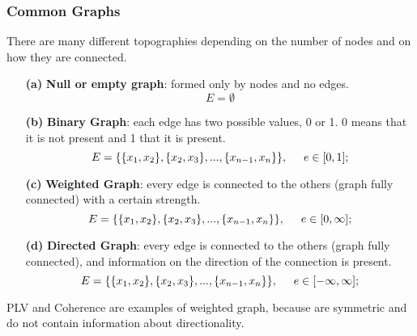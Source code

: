 \subsubsection{Common Graphs}
There are many different topographies depending on the number of nodes and on how they are connected.
\begin{figure}[H]
    \centering
    \subfigure[]{\texttt{[image: 15\_2]}}
    \subfigure[]{\texttt{[image: 15\_3]}}
    \subfigure[]{\texttt{[image: 15\_4]}}
    \subfigure[]{\texttt{[image: 15\_5]}}
\end{figure}
\begin{itemize}
    \item[\textbf{(a)}] \textbf{Null or empty graph}: formed only by nodes and no edges.
        \begin{equation*}
            E=\emptyset
        \end{equation*}
    \item[\textbf{(b)}] \textbf{Binary Graph}: each edge has two possible values, 0 or 1. 0 means that it is not present and 1 that it is present.
        \begin{equation*}
            E=\{\{x_1, x_2\}, \{x_2,x_3\},..., \{x_{n-1},x_n\}\},\hspace{0.5cm}e\in[0,1];
        \end{equation*}
    \item[\textbf{(c)}] \textbf{Weighted Graph}: every edge is connected to the others (graph fully connected) with a certain strength.
        \begin{equation*}
            E=\{\{x_1, x_2\}, \{x_2,x_3\},..., \{x_{n-1},x_n\}\},\hspace{0.5cm}e\in[0,\infty];
        \end{equation*}
    \item[\textbf{(d)}] \textbf{Directed Graph}: every edge is connected to the others (graph fully connected), and information on the direction of
        the connection is present.
        \begin{equation*}
            E=\{\{x_1, x_2\}, \{x_2,x_3\},..., \{x_{n-1},x_n\}\},\hspace{0.5cm}e\in[-\infty,\infty];
        \end{equation*}
\end{itemize}
PLV and Coherence are examples of weighted graph, because are symmetric and do not contain information about directionality.


